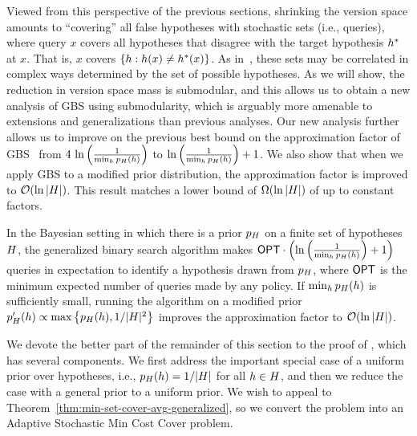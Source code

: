 Viewed from this perspective of the previous sections, shrinking the
version space amounts to ``covering'' all false hypotheses with stochastic
sets (i.e., queries), where query $x$ covers all hypotheses that
disagree with the target hypothesis $h^*$ at $x$.  That is, 
$x$ covers $\left\{h : h(x) \neq h^*(x)\right\}$.  As
in~, these sets may be correlated in
complex ways determined by the set of possible hypotheses.
%
%
%
As we will show, the reduction in version space mass is \term
submodular, and this allows us to obtain 
%
a new analysis of GBS using \term submodularity, 
which is arguably more amenable to extensions
and generalizations than previous analyses.
Our new analysis further allows us to improve on the previous best bound on the approximation factor of GBS~\citep{dasgupta04} from 
$4 \,\ln  \left( {\frac{1}{\min_{h}
  p_{H}(h)}} \right) $ to $\ln  \left( {\frac{1}{\min_{h}
  p_{H}(h)}} \right)  + 1$. 
We also show that when we apply GBS to a modified prior distribution,
the approximation factor is improved to ${\mathcal{O}}(\ln |H|)$. 
This result  matches a  lower bound of $\Omega(\ln |H|)$ of
\citet{chakaravarthy07decision} 
up to constant factors. 


\begin{theorem} \label{thm:optimal-decision-trees}
%
  In the Bayesian setting in which there is a prior $p_{H}$ on a
  finite set of hypotheses $H$, the generalized binary search algorithm
  makes $\textsf{OPT} \cdot  \left( { \ln  \left( {\frac{1}{\min_{h} p_{H}(h)}} \right)  + 1} \right) $ queries in
  expectation to identify a hypothesis drawn from $p_{H}$, 
  where $\textsf{OPT}$ is the minimum expected number of queries
  made by any policy.  
  If $\min_{h} p_{H}(h)$ is sufficiently small,
  running the algorithm on a modified prior 
$p_{H}'(h) \propto \max\left\{p_{H}(h), 1/|H|^{2}\right\}$ improves the approximation factor to 
${\mathcal{O}}(\ln |H|)$.
\end{theorem}

%

We devote the better part of the remainder of this section to the
proof of , which has several
components.
We first address the important special case of a uniform prior
over hypotheses, i.e., $p_{H}(h) = 1/|H|$ for all $h \in
H$, and then we reduce the case with a general prior to a
uniform prior.
We wish to appeal to Theorem~\ref{thm:min-set-cover-avg-generalized},
so we convert the problem into an Adaptive Stochastic Min Cost Cover problem.  

